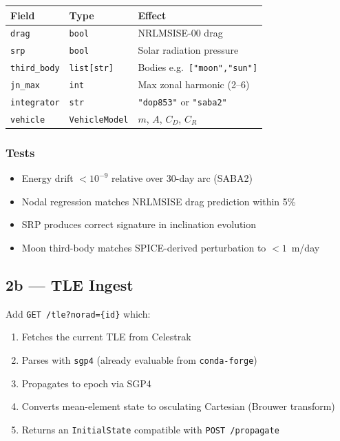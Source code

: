 \documentclass[11pt, a4paper]{article}
\begin{document}
\begin{center}
\begin{tabular}{L{3cm} L{4cm} L{5cm}}
  \toprule
  \textbf{Field} & \textbf{Type} & \textbf{Effect} \\
  \midrule
  \texttt{drag}       & \texttt{bool}        & NRLMSISE-00 drag \\
  \texttt{srp}        & \texttt{bool}        & Solar radiation pressure \\
  \texttt{third\_body}& \texttt{list[str]}   & Bodies e.g.\ \texttt{["moon","sun"]} \\
  \texttt{jn\_max}    & \texttt{int}         & Max zonal harmonic (2–6) \\
  \texttt{integrator} & \texttt{str}         & \texttt{"dop853"} or \texttt{"saba2"} \\
  \texttt{vehicle}    & \texttt{VehicleModel}& $m$, $A$, $C_D$, $C_R$ \\
  \bottomrule
\end{tabular}
\end{center}

\subsubsection{Tests}

\begin{itemize}[noitemsep]
  \item Energy drift $< 10^{-9}$ relative over 30-day arc (SABA2)
  \item Nodal regression matches NRLMSISE drag prediction within 5\%
  \item SRP produces correct signature in inclination evolution
  \item Moon third-body matches SPICE-derived perturbation to $< 1$~m/day
\end{itemize}

\subsection{2b — TLE Ingest}

Add \texttt{GET /tle?norad=\{id\}} which:
\begin{enumerate}[noitemsep]
  \item Fetches the current TLE from Celestrak
  \item Parses with \texttt{sgp4} (already evaluable from \texttt{conda-forge})
  \item Propagates to epoch via SGP4
  \item Converts mean-element state to osculating Cartesian (Brouwer transform)
  \item Returns an \texttt{InitialState} compatible with \texttt{POST /propagate}
\end{enumerate}
\end{document}
